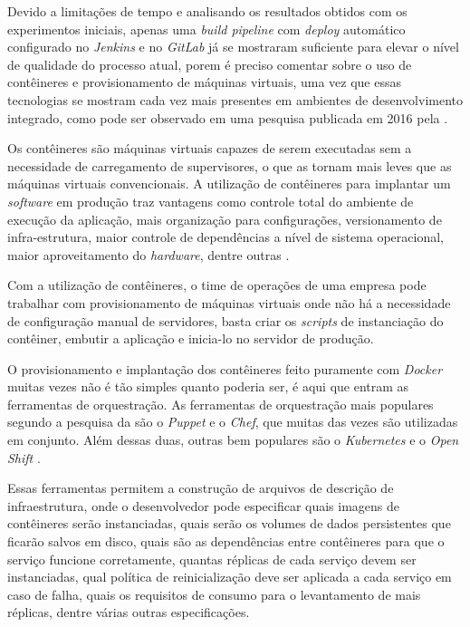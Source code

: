 \documentclass[
12pt,				%
openright,			%
oneside,			%
a4paper,			%
english,			%
french,				%
spanish,			%
brazil,				%
]{abntex2}
\begin{document}
Devido a limitações de tempo e analisando os resultados obtidos com os experimentos iniciais, apenas uma \textit{build pipeline} com \textit{deploy} automático configurado no \textit{Jenkins} e no \textit{GitLab} já se mostraram suficiente para elevar o nível de qualidade do processo atual, porem é preciso comentar sobre o uso de contêineres e provisionamento de máquinas virtuais, uma vez que essas tecnologias se mostram cada vez mais presentes em ambientes de desenvolvimento integrado, como pode ser observado em uma pesquisa publicada em 2016 pela .

Os contêineres são máquinas virtuais capazes de serem executadas sem a necessidade de carregamento de supervisores, o que as tornam mais leves que as máquinas virtuais convencionais. A utilização de contêineres para implantar um \textit{software} em produção traz vantagens como controle total do ambiente de execução da aplicação, mais organização para configurações, versionamento de infra-estrutura, maior controle de dependências a nível de sistema operacional, maior aproveitamento do \textit{hardware}, dentre outras \cite{JamesTurbull:DockerBook}.

Com a utilização de contêineres, o time de operações de uma empresa pode trabalhar com provisionamento de máquinas virtuais onde não há a necessidade de configuração manual de servidores, basta criar os \textit{scripts} de instanciação do contêiner, embutir a aplicação e inicia-lo no servidor de produção.

O provisionamento e implantação dos contêineres feito puramente com \textit{Docker} muitas vezes não é tão simples quanto poderia ser, é aqui que entram as ferramentas de orquestração. As ferramentas de orquestração mais populares segundo a pesquisa da  são o \textit{Puppet} e o \textit{Chef}, que muitas das vezes são utilizadas em conjunto. Além dessas duas, outras bem populares são o 
\textit{Kubernetes} \cite{Kubernetes:Orchestration} e o \textit{Open Shift} \cite{OpenShift:Orchestration}.

Essas ferramentas permitem a construção de arquivos de descrição de infraestrutura, onde o desenvolvedor pode especificar quais imagens de contêineres serão instanciadas, quais serão os volumes de dados persistentes que ficarão salvos em disco, quais são as dependências entre contêineres para que o serviço funcione corretamente, quantas réplicas de cada serviço devem ser instanciadas, qual política de reinicialização deve ser aplicada a cada serviço em caso de falha, quais os requisitos de consumo para o levantamento de mais réplicas, dentre várias outras especificações.
\end{document}
